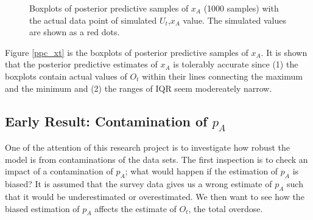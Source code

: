 \documentclass[]{article}
\begin{document}
\begin{figure}[htb]
	\centering
	\caption[two early result box plots:]{Boxplots of posterior predictive samples of $x_A$ (1000 samples) with the actual data point of simulated $U_t$,$x_A$ value. The simulated values are shown as a red dots.}
	
\end{figure}

Figure \ref{ppc_xt} is the boxplots of posterior predictive samples of $x_A$. It is shown that the posterior predictive estimates of $x_A$ is tolerably accurate since (1) the boxplots contain actual values of $O_t$ within their lines connecting the maximum and the minimum and (2) the ranges of IQR seem modereately narrow. \\



\subsection{Early Result: Contamination of $p_A$ } 
One of the attention of this research project is to investigate how robust the model is from contaminations of the data sets. The first inspection is to check an impact of a contamination of $p_A$; what would happen if the estimation of $p_A$ is biased? It is assumed that the survey data gives us a wrong estimate of $p_A$ such that it would be underestimated or overestimated. We then want to see how the biased estimation of $p_A$ affects the estimate of $O_t$, the total overdose.\\
\end{document}
